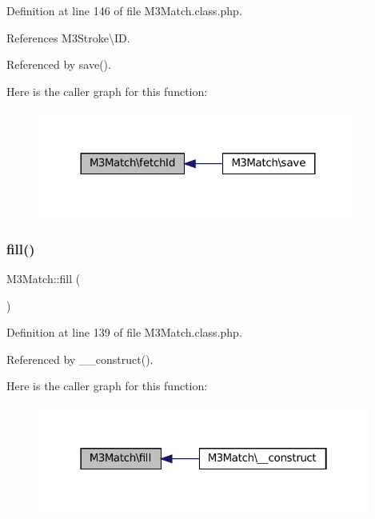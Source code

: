 Definition at line 146 of file M3\+Match.\+class.\+php.



References M3\+Stroke\textbackslash{}\+ID.



Referenced by save().

Here is the caller graph for this function\+:\nopagebreak
\begin{figure}[H]
\begin{center}
\leavevmode
\includegraphics[width=299pt]{class_m3_match_a43c3f9c8f276a069911effc919d77911_icgraph}
\end{center}
\end{figure}
\mbox{\label{class_m3_match_a17757688db1d5ce6577b73c669dc9d11}} 
\subsubsection{\texorpdfstring{fill()}{fill()}}
{\footnotesize\ttfamily M3\+Match\+::fill (\begin{DoxyParamCaption}{ }\end{DoxyParamCaption})\hspace{0.3cm}{\ttfamily [protected]}}



Definition at line 139 of file M3\+Match.\+class.\+php.



Referenced by \+\_\+\+\_\+construct().

Here is the caller graph for this function\+:\nopagebreak
\begin{figure}[H]
\begin{center}
\leavevmode
\includegraphics[width=310pt]{class_m3_match_a17757688db1d5ce6577b73c669dc9d11_icgraph}
\end{center}
\end{figure}
\mbox{\label{class_m3_match_a05b5ca86c54022cb8b9c7a0e53bf16ae}} 
